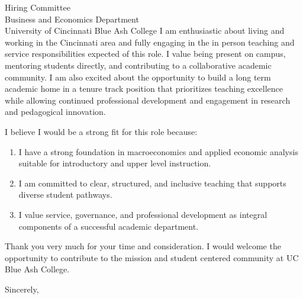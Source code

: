 \documentclass[11pt,letterpaper]{letter}
\begin{document}
\begin{letter}{
Hiring Committee \\
Business and Economics Department \\
University of Cincinnati Blue Ash College
}
I am enthusiastic about living and working in the Cincinnati area and fully engaging in the in person teaching and service responsibilities expected of this role. I value being present on campus, mentoring students directly, and contributing to a collaborative academic community. I am also excited about the opportunity to build a long term academic home in a tenure track position that prioritizes teaching excellence while allowing continued professional development and engagement in research and pedagogical innovation.

I believe I would be a strong fit for this role because:
\begin{enumerate}
    \item I have a strong foundation in macroeconomics and applied economic analysis suitable for introductory and upper level instruction.
    \item I am committed to clear, structured, and inclusive teaching that supports diverse student pathways.
    \item I value service, governance, and professional development as integral components of a successful academic department.
\end{enumerate}

Thank you very much for your time and consideration. I would welcome the opportunity to contribute to the mission and student centered community at UC Blue Ash College.

\closing{Sincerely,}

\end{letter}
\end{document}
